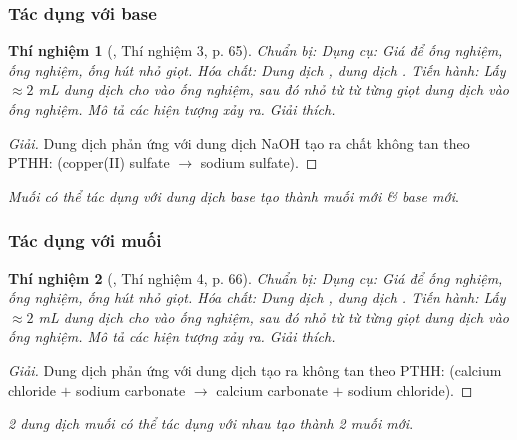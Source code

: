 \documentclass{article}
\newtheorem{thinghiem}{Thí nghiệm}
\begin{document}
\subsubsection{Tác dụng với base}

\begin{thinghiem}[\cite{SGK_KHTN_8_Canh_Dieu}, Thí nghiệm 3, p. 65]
	\emph{Chuẩn bị:} Dụng cụ: Giá để ống nghiệm, ống nghiệm, ống hút nhỏ giọt. Hóa chất: Dung dịch \emph{}, dung dịch \emph{}. \emph{Tiến hành:} Lấy $\approx2$ \emph{mL} dung dịch \emph{} cho vào ống nghiệm, sau đó nhỏ từ từ từng giọt dung dịch \emph{} vào ống nghiệm. Mô tả các hiện tượng xảy ra. Giải thích.
\end{thinghiem}

\begin{proof}[Giải]
	Dung dịch  phản ứng với dung dịch NaOH tạo ra chất không tan  theo PTHH:  (copper(II) sulfate $\to$ sodium sulfate).
\end{proof}
\textit{Muối có thể tác dụng với dung dịch base tạo thành muối mới \& base mới}.

\subsubsection{Tác dụng với muối}

\begin{thinghiem}[\cite{SGK_KHTN_8_Canh_Dieu}, Thí nghiệm 4, p. 66]
	\emph{Chuẩn bị:} Dụng cụ: Giá để ống nghiệm, ống nghiệm, ống hút nhỏ giọt. Hóa chất: Dung dịch \emph{}, dung dịch \emph{}. \emph{Tiến hành:} Lấy $\approx2$ \emph{mL} dung dịch \emph{} cho vào ống nghiệm, sau đó nhỏ từ từ từng giọt dung dịch \emph{} vào ống nghiệm. Mô tả các hiện tượng xảy ra. Giải thích.
\end{thinghiem}

\begin{proof}[Giải]
	Dung dịch  phản ứng với dung dịch  tạo ra  không tan theo PTHH:  (calcium chloride $+$ sodium carbonate $\to$ calcium carbonate $+$ sodium chloride).
\end{proof}
\textit{2 dung dịch muối có thể tác dụng với nhau tạo thành 2 muối mới}.
\end{document}
